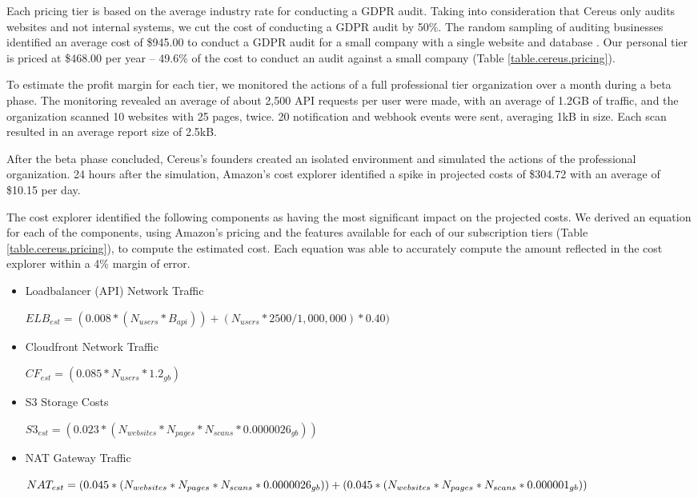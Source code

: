 Each pricing tier is based on the average industry rate for conducting a GDPR audit. Taking into consideration that Cereus only audits websites and not internal systems, we cut the cost of conducting a GDPR audit by 50\%. The random sampling of auditing businesses identified an average cost of \$945.00 to conduct a GDPR audit for a small company with a single website and database \cite{gdpr.auditcosts.2020}. Our personal tier is priced at \$468.00 per year -- 49.6\% of the cost to conduct an audit against a small company (Table \ref{table.cereus.pricing}).

To estimate the profit margin for each tier, we monitored the actions of a full professional tier organization over a month during a beta phase. The monitoring revealed an average of about 2,500 API requests per user were made, with an average of 1.2GB of traffic, and the organization scanned 10 websites with 25 pages, twice. 20 notification and webhook events were sent, averaging 1kB in size. Each scan resulted in an average report size of 2.5kB. 

After the beta phase concluded, Cereus's founders created an isolated environment and simulated the actions of the professional organization. 24 hours after the simulation, Amazon's cost explorer identified a spike in projected costs of \$304.72 with an average of \$10.15 per day.

The cost explorer identified the following components as having the most significant impact on the projected costs. We derived an equation for each of the components, using Amazon's pricing and the features available for each of our subscription tiers (Table \ref{table.cereus.pricing}), to compute the estimated cost. Each equation was able to accurately compute the amount reflected in the cost explorer within a 4\% margin of error.

\begin{itemize}

\item Loadbalancer (API) Network Traffic

\( ELB_{est} = (0.008*(N_{users}*B_{api})) + (N_{users}*2500/1,000,000)*0.40) \)

\item Cloudfront Network Traffic

\( CF_{est} = (0.085 * N_{users} * 1.2_{gb}) \)

\item S3 Storage Costs

\(S3_{est} = (0.023 * (N_{websites} * N_{pages} * N_{scans} * 0.0000026_{gb}))\)

\item NAT Gateway Traffic

\(
  NAT_{est} = (0.045 * (N_{websites} * N_{pages} * N_{scans} * 0.0000026_{gb})) + \\
  (0.045 * (N_{websites} * N_{pages} * N_{scans} * 0.000001_{gb}))
\)

\end{itemize}

